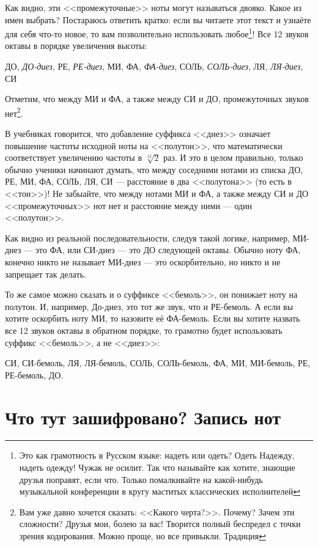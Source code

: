 Как видно, эти <<промежуточные>> ноты могут называться двояко. Какое из имен выбрать? Постараюсь ответить кратко: если вы читаете этот текст и узнаёте для себя что-то новое, то вам позволительно использовать любое\footnote{Это как грамотность в Русском языке: надеть или одеть? Одеть Надежду, надеть одежду! Чужак не осилит. Так что называйте как хотите, знающие друзья поправят, если что. Только помалкивайте на какой-нибудь музыкальной конференции в кругу маститых классических исполнителей}! Все 12 звуков октавы в порядке увеличения высоты:
\begin{center}
    ДО, \emph{ДО-диез}, РЕ, \emph{РЕ-диез}, МИ, ФА, \emph{ФА-диез}, СОЛЬ, \emph{СОЛЬ-диез}, ЛЯ, \emph{ЛЯ-диез}, СИ
\end{center}

Отметим, что между МИ и ФА, а также между СИ и ДО, промежуточных звуков нет\footnote{Вам уже давно хочется сказать: <<Какого черта?>>. Почему? Зачем эти сложности? Друзья мои, болею за вас! Творится полный беспредел с точки зрения кодирования. Можно проще, но все привыкли. Традиция}.

В учебниках говорится, что добавление суффикса <<диез>> означает повышение частоты исходной ноты на <<полутон>>, что математически соответствует увеличению частоты в $\sqrt[12]{2}$ раз. И это в целом правильно, только обычно ученики начинают думать, что между соседними нотами из списка ДО, РЕ, МИ, ФА, СОЛЬ, ЛЯ, СИ --- расстояние в два <<полутона>> (то есть в <<тон>>)! Не забыайте, что между нотами МИ и ФА, а также между СИ и ДО <<промежуточных>> нот нет и расстояние между ними --- один <<полутон>>. 

Как видно из реальной последовательности, следуя такой логике, например, МИ-диез --- это ФА, или СИ-диез --- это ДО следующей октавы. Обычно ноту ФА, конечно никто не называет МИ-диез --- это оскорбительно, но никто и не запрещает так делать. 

То же самое можно сказать и о суффиксе <<бемоль>>, он понижает ноту на полутон. И, например, До-диез, это тот же звук, что и РЕ-бемоль. А если вы хотите оскорбить ноту МИ, то назовите её ФА-бемоль. Если вы хотите назвать все 12 звуков октавы в обратном порядке, то грамотно будет использовать суффикс <<бемоль>>, а не <<диез>>:

\begin{center}
СИ, СИ-бемоль, ЛЯ, ЛЯ-бемоль, СОЛЬ, СОЛЬ-бемоль, ФА, МИ, МИ-бемоль, РЕ, РЕ-бемоль, ДО.
\end{center}


\section{Что тут зашифровано? Запись нот}

